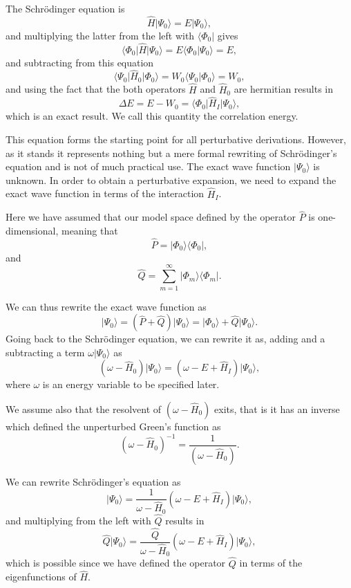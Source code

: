 The Schr\"odinger equation is
\[
\hat{H}\vert \Psi_0\rangle = E\vert \Psi_0\rangle,
\]
and multiplying the latter from the left with $\langle \Phi_0\vert $ gives
\[
\langle \Phi_0\vert \hat{H}\vert \Psi_0\rangle = E\langle \Phi_0\vert \Psi_0\rangle=E,
\]
and subtracting from this equation
\[
\langle \Psi_0\vert \hat{H}_0\vert \Phi_0\rangle= W_0\langle \Psi_0\vert \Phi_0\rangle=W_0,
\]
and using the fact that the both operators $\hat{H}$ and $\hat{H}_0$ are hermitian 
results in
\[
\Delta E=E-W_0=\langle \Phi_0\vert \hat{H}_I\vert \Psi_0\rangle,
\]
which is an exact result. We call this quantity the correlation energy.



This equation forms the starting point for all perturbative derivations. However,
as it stands it represents nothing but a mere formal rewriting of Schr\"odinger's equation and is not of much practical use. The exact wave function $\vert \Psi_0\rangle$ is unknown. In order to obtain a perturbative expansion, we need to expand the exact wave function in terms of the interaction $\hat{H}_I$. 

Here we have assumed that our model space defined by the operator $\hat{P}$ is one-dimensional, meaning that
\[
\hat{P}= \vert \Phi_0\rangle \langle \Phi_0\vert ,
\]
and
\[
\hat{Q}=\sum_{m=1}^{\infty}\vert \Phi_m\rangle \langle \Phi_m\vert .
\]


We can thus rewrite the exact wave function as
\[
\vert \Psi_0\rangle= (\hat{P}+\hat{Q})\vert \Psi_0\rangle=\vert \Phi_0\rangle+\hat{Q}\vert \Psi_0\rangle.
\]
Going back to the Schr\"odinger equation, we can rewrite it as, adding and a subtracting a term $\omega \vert \Psi_0\rangle$ as
\[
\left(\omega-\hat{H}_0\right)\vert \Psi_0\rangle=\left(\omega-E+\hat{H}_I\right)\vert \Psi_0\rangle,
\]
where $\omega$ is an energy variable to be specified later. 


We assume also that the resolvent of $\left(\omega-\hat{H}_0\right)$ exits, that is
it has an inverse which defined the unperturbed Green's function as
\[
\left(\omega-\hat{H}_0\right)^{-1}=\frac{1}{\left(\omega-\hat{H}_0\right)}.
\]

We can rewrite Schr\"odinger's equation as
\[
\vert \Psi_0\rangle=\frac{1}{\omega-\hat{H}_0}\left(\omega-E+\hat{H}_I\right)\vert \Psi_0\rangle,
\]
and multiplying from the left with $\hat{Q}$ results in
\[
\hat{Q}\vert \Psi_0\rangle=\frac{\hat{Q}}{\omega-\hat{H}_0}\left(\omega-E+\hat{H}_I\right)\vert \Psi_0\rangle,
\]
which is possible since we have defined the operator $\hat{Q}$ in terms of the eigenfunctions of $\hat{H}$.




